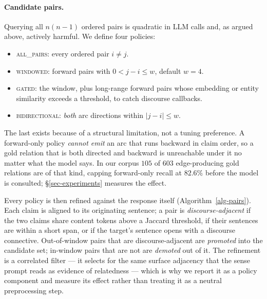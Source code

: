 \paragraph{Candidate pairs.} Querying all $n(n-1)$ ordered pairs is quadratic in LLM calls and, as
argued above, actively harmful. We define four policies:
\begin{itemize}[leftmargin=1.4em,itemsep=1pt,topsep=2pt]
\item \textsc{all\_pairs}: every ordered pair $i\neq j$.
\item \textsc{windowed}: forward pairs with $0<j-i\le w$, default $w=4$.
\item \textsc{gated}: the window, plus long-range forward pairs whose embedding or entity
  similarity exceeds a threshold, to catch discourse callbacks.
\item \textsc{bidirectional}: \emph{both} arc directions within $|j-i|\le w$.
\end{itemize}
The last exists because of a structural limitation, not a tuning preference. A forward-only policy
\emph{cannot emit} an arc that runs backward in claim order, so a gold relation that is both
directed and backward is unreachable under it no matter what the model says. In our corpus $105$ of
$603$ edge-producing gold relations are of that kind, capping forward-only recall at $82.6\%$ before
the model is consulted; \S\ref{sec-experiments} measures the effect.

Every policy is then refined against the response itself (Algorithm~\ref{alg-pairs}). Each claim is
aligned to its originating sentence; a pair is \emph{discourse-adjacent} if the two claims share
content tokens above a Jaccard threshold, if their sentences are within a short span, or if the
target's sentence opens with a discourse connective. Out-of-window pairs that are discourse-adjacent
are \emph{promoted} into the candidate set; in-window pairs that are not are \emph{demoted} out of
it. The refinement is a correlated filter --- it selects for the same surface adjacency that the
sense prompt reads as evidence of relatedness --- which is why we report it as a policy component
and measure its effect rather than treating it as a neutral preprocessing step.

